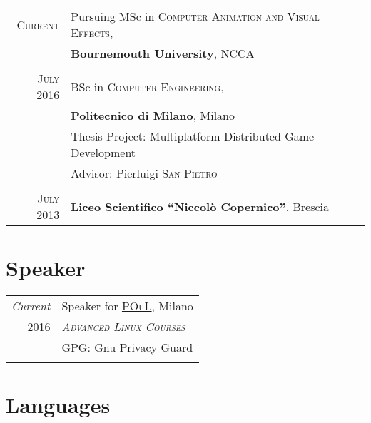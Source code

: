 \documentclass[a4paper,10pt]{article} %
\begin{document}
\begin{tabular}{rl}
\textsc{Current} & Pursuing MSc in \textsc{Computer Animation and Visual Effects}, \\
& \textbf{Bournemouth University}, NCCA\\
&\\


\textsc{July} 2016& BSc in \textsc{}\textsc{Computer Engineering}, \\
& \normalsize\textbf{Politecnico di Milano}, Milano\\
& Thesis Project: Multiplatform Distributed Game Development\\
& \small Advisor: Pierluigi \textsc{San Pietro}\\
&\\


\textsc{July} 2013& \textbf{Liceo Scientifico ``Niccolò Copernico''}, Brescia
\end{tabular}



\section{Speaker}

\begin{tabular}{r|p{11cm}}
\emph{Current} & Speaker for \href{https://poul.org}{\textsc{POuL}}, Milano \\
\textsc{ 2016} & \href{https://www.youtube.com/watch?v=MiISEzvNohM&list=PLA27EZBY5veNCWiZBMl34eCzujwxKnMqb&index=6}{\textsc{\emph{Advanced Linux Courses}}}\\
& \footnotesize{GPG: Gnu Privacy Guard}\\
 \\

\end{tabular}

\section{Languages}
\end{document}
